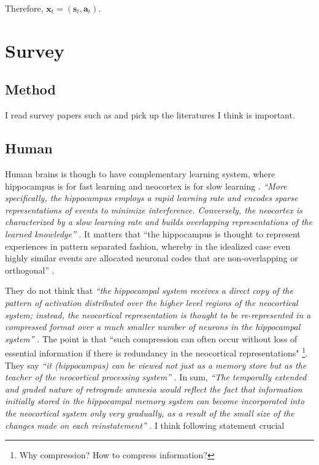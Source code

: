 \documentclass[12pt]{article}
\begin{document}
Therefore, $\bm{x}_t = (\bm{s}_t, \bm{a}_t)$.

\section{Survey}
\subsection{Method}
I read survey papers such as \cite{Parisi19} and pick up the literatures I think is important. 

\subsection{Human}
Human brains is though to have complementary learning system, where hippocampus is for 
fast learning and neocortex is for slow learning \cite{Mcclelland95}. \textit{``More specifically, the hippocampus employs
a rapid learning rate and encodes sparse representations of events to minimize interference. Conversely, the neocortex is characterized by a slow learning rate and builds overlapping representations
of the learned knowledge''} \cite{Parisi19}. It matters that ``the hippocampus is thought to represent experiences in pattern separated fashion, 
whereby in the idealized case even highly similar events are allocated
neuronal codes that are non-overlapping or orthogonal'' \cite{Kumaran16}.

They do not think that 
\textit{``the hippocampal system receives a direct copy of
the pattern of activation distributed over the higher level regions
of the neocortical system; instead, the neocortical representation is thought to be re-represented in a compressed format over
a much smaller number of neurons in the hippocampal system'' }\cite{Mcclelland95}. The point is that 
``such compression can often occur without loss of essential 
information if there is redundancy in the neocortical representations" \cite{Mcclelland95} 
\footnote{Why compression? How to compress information?}. They say \textit{``it (hippocampus) can be
viewed not just as a memory store but as the teacher of the neocortical processing system''} 
\cite{Mcclelland95}. In sum, \textit{``The temporally extended and
graded nature of retrograde amnesia would reflect the fact that
information initially stored in the hippocampal memory system can become incorporated into the neocortical system only
very gradually, as a result of the small size of the changes made
on each reinstatement''} \cite{Mcclelland95}. I think following statement crucial 
\end{document}
